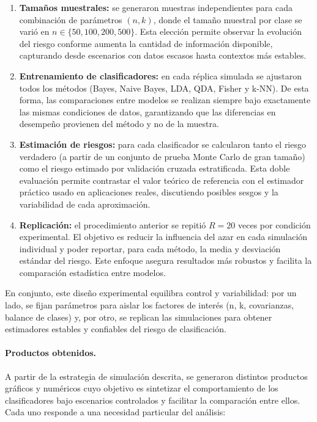 \documentclass[10pt]{article}
\begin{document}
\begin{enumerate}
    \item \textbf{Tamaños muestrales:} se generaron muestras independientes para cada combinación de parámetros $(n,k)$, donde el tamaño muestral por clase se varió en $n \in \{50, 100, 200, 500\}$. Esta elección permite observar la evolución del riesgo conforme aumenta la cantidad de información disponible, capturando desde escenarios con datos escasos hasta contextos más estables.
    
    \item \textbf{Entrenamiento de clasificadores:} en cada réplica simulada se ajustaron todos los métodos (Bayes, Naive Bayes, LDA, QDA, Fisher y k-NN). De esta forma, las comparaciones entre modelos se realizan siempre bajo exactamente las mismas condiciones de datos, garantizando que las diferencias en desempeño provienen del método y no de la muestra.
    
    \item \textbf{Estimación de riesgos:} para cada clasificador se calcularon tanto el riesgo verdadero (a partir de un conjunto de prueba Monte Carlo de gran tamaño) como el riesgo estimado por validación cruzada estratificada. Esta doble evaluación permite contrastar el valor teórico de referencia con el estimador práctico usado en aplicaciones reales, discutiendo posibles sesgos y la variabilidad de cada aproximación.
    
    \item \textbf{Replicación:} el procedimiento anterior se repitió $R=20$ veces por condición experimental. El objetivo es reducir la influencia del azar en cada simulación individual y poder reportar, para cada método, la media y desviación estándar del riesgo. Este enfoque asegura resultados más robustos y facilita la comparación estadística entre modelos.
\end{enumerate}

En conjunto, este diseño experimental equilibra control y variabilidad: por un lado, se fijan parámetros para aislar los factores de interés (n, k, covarianzas, balance de clases) y, por otro, se replican las simulaciones para obtener estimadores estables y confiables del riesgo de clasificación.


\paragraph{Productos obtenidos.}
A partir de la estrategia de simulación descrita, se generaron distintos productos gráficos y numéricos cuyo objetivo es sintetizar el comportamiento de los clasificadores bajo escenarios controlados y facilitar la comparación entre ellos. Cada uno responde a una necesidad particular del análisis:
\end{document}

